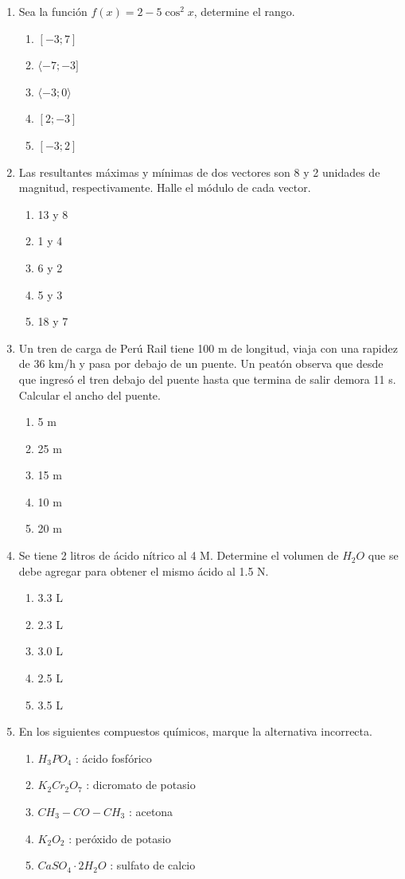 \begin{enumerate}
	\item Sea la función $f(x)=2-5\cos^2 x$, determine el rango.
	\begin{enumerate}[label=\alph*)]
		\item $[-3;7]$
		\item $\langle -7;-3]$
		\item $\langle -3;0\rangle$
		\item $[2;-3]$
		\item $[-3;2]$
	\end{enumerate}
	
	\item Las resultantes máximas y mínimas de dos vectores son 8 y 2 unidades de magnitud, respectivamente. Halle el módulo de cada vector.
	\begin{enumerate}[label=\alph*)]
		\item 13 y 8
		\item 1 y 4
		\item 6 y 2
		\item 5 y 3
		\item 18 y 7
	\end{enumerate}
	
	\item Un tren de carga de Perú Rail tiene 100 m de longitud, viaja con una rapidez de 36 km/h y pasa por debajo de un puente. Un peatón observa que desde que ingresó el tren debajo del puente hasta que termina de salir demora 11 s. Calcular el ancho del puente.
	\begin{enumerate}[label=\alph*)]
		\item 5 m
		\item 25 m
		\item 15 m
		\item 10 m
		\item 20 m
	\end{enumerate}
	
	\item Se tiene 2 litros de ácido nítrico al 4 M. Determine el volumen de $H_2O$ que se debe agregar para obtener el mismo ácido al 1.5 N.
	\begin{enumerate}[label=\alph*)]
		\item 3.3 L
		\item 2.3 L
		\item 3.0 L
		\item 2.5 L
		\item 3.5 L
	\end{enumerate}
	
	\item En los siguientes compuestos químicos, marque la alternativa incorrecta.
	\begin{enumerate}[label=\alph*)]
		\item $H_3PO_4$ : ácido fosfórico
		\item $K_2Cr_2O_7$ : dicromato de potasio
		\item $CH_3-CO-CH_3$ : acetona
		\item $K_2O_2$ : peróxido de potasio
		\item $CaSO_4\cdot 2H_2O$ : sulfato de calcio
	\end{enumerate}
	

\end{enumerate}
